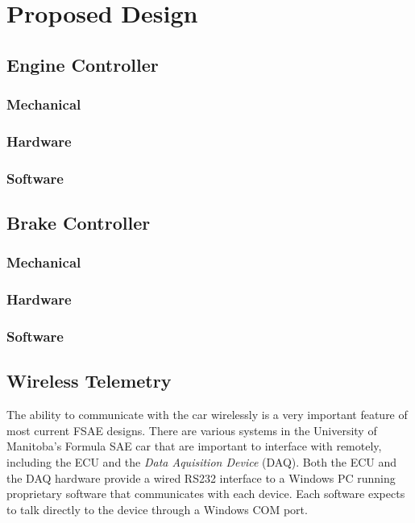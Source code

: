 %
%
%
%

\section{Proposed Design}

\subsection{Engine Controller}

\subsubsection{Mechanical}
\subsubsection{Hardware}
\subsubsection{Software}

\subsection{Brake Controller}

\subsubsection{Mechanical}
\subsubsection{Hardware}
\subsubsection{Software}

\subsection{Wireless Telemetry}

The ability to communicate with the car wirelessly is a very important
feature of most current FSAE designs. There are various systems in
the University of Manitoba's Formula SAE car that are important to
interface with remotely, including the ECU and the \emph{Data Aquisition
Device} (DAQ).
Both the ECU and the DAQ hardware provide a wired RS232 interface
to a Windows PC running proprietary software that communicates with
each device. Each software expects to talk directly to the device
through a Windows COM port.

